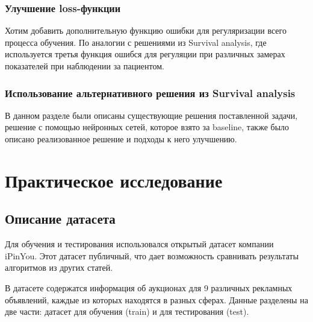 \documentclass[times,specification,annotation]{itmo-student-thesis}
\begin{document}
\subsection{Улучшение loss-функции}

Хотим добавить дополнительную функцию ошибки для регуляризации всего процесса обучения. 
По аналогии с решениями из Survival analysis, где используется третья функция ошибся для регуляции 
при различных замерах показателей при наблюдении за пациентом.

\subsection{Использование альтернативного решения из Survival analysis}

\chapterconclusion

В данном разделе были описаны существующие решения поставленной задачи, 
решение с помощью нейронных сетей, которое взято за baseline, 
также было описано реализованное решение и подходы к него улучшению.

\chapter{Практическое исследование}

\section{Описание датасета}

Для обучения и тестирования использовался открытый датасет компании iPinYou.
Этот датасет публичный, что дает возможность сравнивать результаты алгоритмов из других статей. 

В датасете содержатся информация об аукционах для 9 различных рекламных объявлений, 
каждые из которых находятся в разных сферах. 
Данные разделены на две части: датасет для обучения (train) и для тестирования (test).
\end{document}
